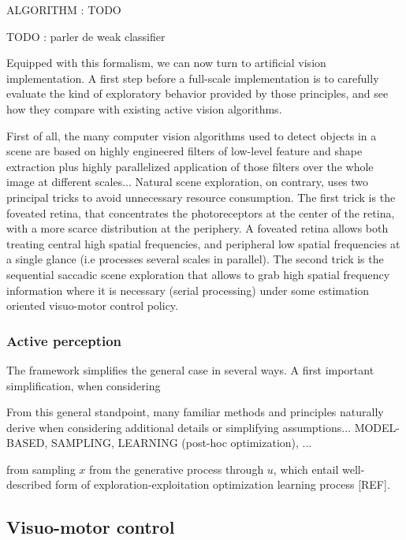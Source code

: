 \documentclass{article} %
\begin{document}
{\color{magenta} ALGORITHM : TODO}

TODO : parler de weak classifier  

Equipped with this formalism, we can now turn to artificial vision implementation. 
A first step before a full-scale implementation is to carefully evaluate the kind of exploratory behavior provided by those principles, and see how they compare with existing active vision algorithms. 

{\color{blue}First of all, the many computer vision algorithms used to detect objects in a scene are based on highly engineered filters of low-level feature and shape extraction plus highly parallelized application of those filters over the whole image at different scales... Natural scene exploration, on contrary, uses two principal tricks to avoid unnecessary resource consumption. The first trick is the foveated retina, that concentrates the photoreceptors at the center of the retina, with a more scarce distribution at the periphery. A foveated retina allows both treating central high spatial frequencies, and peripheral low spatial frequencies at a single glance (i.e processes several scales in parallel). The second trick is the sequential saccadic scene exploration that allows to grab high spatial frequency information where it is necessary (serial processing) under some estimation oriented visuo-motor control policy. }





\subsubsection{Active perception}

The framework simplifies the general case in several ways. A first important simplification, when considering 

{\color{green} From this general standpoint, many familiar methods and principles naturally derive when considering additional details or simplifying assumptions... MODEL-BASED, SAMPLING, LEARNING (post-hoc optimization), ...}

{\color{green} from sampling $x$ from the generative process through $u$, which entail well-described form of exploration-exploitation optimization learning process [REF].}





\subsection{Visuo-motor control}
\end{document}
